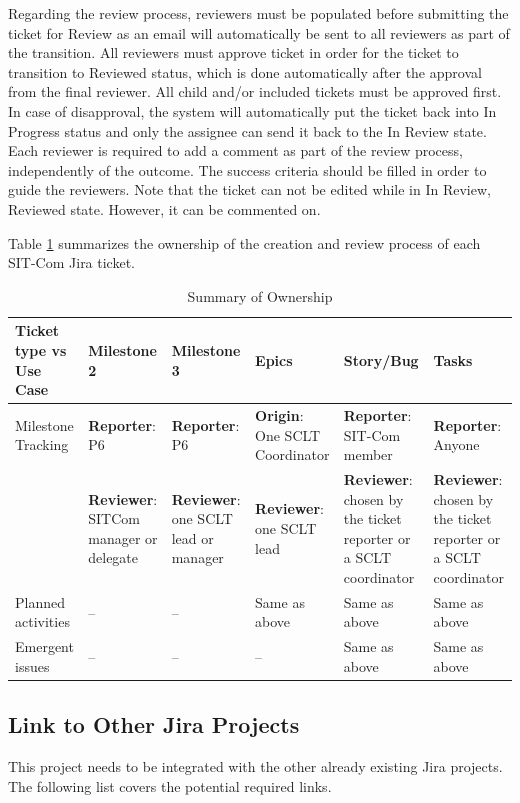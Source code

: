 \documentclass[SE,authoryear,toc]{lsstdoc}
\begin{document}
Regarding the review process, reviewers must be populated before submitting the ticket for Review as an email will automatically be sent to all reviewers as part of the transition. 
All reviewers must approve ticket in order for the ticket to transition to Reviewed status, which is done automatically after the approval from the final reviewer. 
All child and/or included tickets must be approved first. 
In case of disapproval, the system will automatically put the ticket back into In Progress status and only the assignee can send it back to the In Review state. 
Each reviewer is required to add a comment as part of the review process, independently of the outcome. 
The success criteria should be filled in order to guide the reviewers.
Note that the ticket can not be edited while in In Review, Reviewed state. 
However, it can be commented on. 


Table \ref{tab:owner} summarizes the ownership of the creation and review process of each SIT-Com Jira ticket. 
\begin{table}
\begin{center}
\caption{\label{tab:owner} Summary of Ownership}
\begin{tabular}{|p{1.8cm}|p{1.8cm}|p{1.8cm}|p{1.8cm}|p{1.8cm}|p{1.8cm}}
\hline
Ticket type vs Use Case              & Milestone 2	& Milestone 3& Epics	& Story/Bug	& Tasks \\
\hline
\hline
Milestone Tracking & {\bf Reporter}: P6 &{\bf Reporter}: P6& {\bf Origin}: One SCLT Coordinator & {\bf Reporter}: SIT-Com member & {\bf Reporter}: Anyone \\
 & {\bf Reviewer}: SITCom manager or delegate & {\bf Reviewer}: one SCLT lead or manager & {\bf Reviewer}: one SCLT lead & {\bf Reviewer}: chosen by the ticket reporter or a SCLT coordinator & {\bf Reviewer}: chosen by the ticket reporter or a SCLT coordinator \\
\hline
Planned activities & -- & -- & Same as above & Same as above & Same as above \\
\hline
Emergent issues & -- & -- & -- & Same as above & Same as above \\
\hline
\end{tabular}
\end{center}
\end{table}

\subsection{Link to Other Jira Projects}
This project needs to be integrated with the other already existing Jira projects. 
The following list covers the potential required links.
\end{document}
